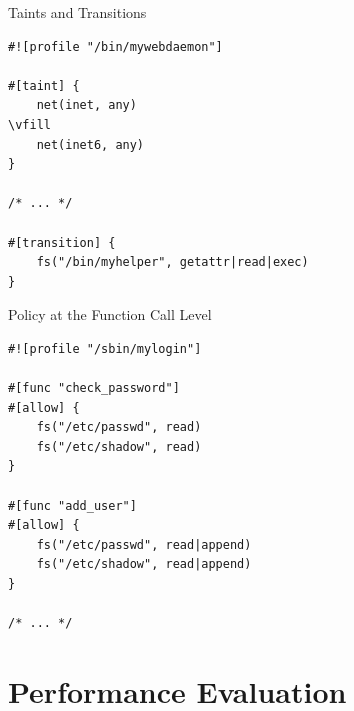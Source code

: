 \documentclass[12pt, dvipsnames]{beamer}
\begin{document}
\begin{frame}[c, fragile]{Taints and Transitions}
\begin{lstlisting}[language=bpfbox, xleftmargin=.25\textwidth]
#![profile "/bin/mywebdaemon"]

#[taint] {
    net(inet, any)
\vfill
    net(inet6, any)
}

/* ... */

#[transition] {
    fs("/bin/myhelper", getattr|read|exec)
}
\end{lstlisting}
\end{frame}

\begin{frame}[c, fragile]{Policy at the Function Call Level}
\begin{lstlisting}[language=bpfbox, xleftmargin=.25\textwidth]
#![profile "/sbin/mylogin"]

#[func "check_password"]
#[allow] {
    fs("/etc/passwd", read)
    fs("/etc/shadow", read)
}

#[func "add_user"]
#[allow] {
    fs("/etc/passwd", read|append)
    fs("/etc/shadow", read|append)
}

/* ... */
\end{lstlisting}
\end{frame}

%

\section{Performance Evaluation}
\end{document}
